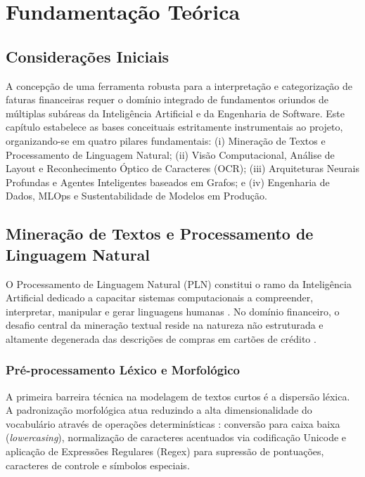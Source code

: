 \documentclass[
	12pt,				
	openright,			
	oneside,			
	a4paper,			
	english,			
	brazil				
	]{abntex2}
\begin{document}
\chapter{Fundamentação Teórica}
\label{chp:fundamentacao}

\section{Considerações Iniciais}
\label{sec:fund_consideracoes_iniciais}

A concepção de uma ferramenta robusta para a interpretação e categorização de faturas financeiras requer o domínio integrado de fundamentos oriundos de múltiplas subáreas da Inteligência Artificial e da Engenharia de Software. Este capítulo estabelece as bases conceituais estritamente instrumentais ao projeto, organizando-se em quatro pilares fundamentais: (i) Mineração de Textos e Processamento de Linguagem Natural; (ii) Visão Computacional, Análise de Layout e Reconhecimento Óptico de Caracteres (OCR); (iii) Arquiteturas Neurais Profundas e Agentes Inteligentes baseados em Grafos; e (iv) Engenharia de Dados, MLOps e Sustentabilidade de Modelos em Produção.

\section{Mineração de Textos e Processamento de Linguagem Natural}
\label{sec:fund_pln}

O Processamento de Linguagem Natural (PLN) constitui o ramo da Inteligência Artificial dedicado a capacitar sistemas computacionais a compreender, interpretar, manipular e gerar linguagens humanas \cite{BPLN_livro:2024, chowdhury2003natural}. No domínio financeiro, o desafio central da mineração textual reside na natureza não estruturada e altamente degenerada das descrições de compras em cartões de crédito \cite{santos2023classificacao}.

\subsection{Pré-processamento Léxico e Morfológico}
A primeira barreira técnica na modelagem de textos curtos é a dispersão léxica. A padronização morfológica atua reduzindo a alta dimensionalidade do vocabulário através de operações determinísticas \cite{BPLN_livro:2024}: conversão para caixa baixa (\textit{lowercasing}), normalização de caracteres acentuados via codificação Unicode e aplicação de Expressões Regulares (Regex) para supressão de pontuações, caracteres de controle e símbolos especiais.
\end{document}
